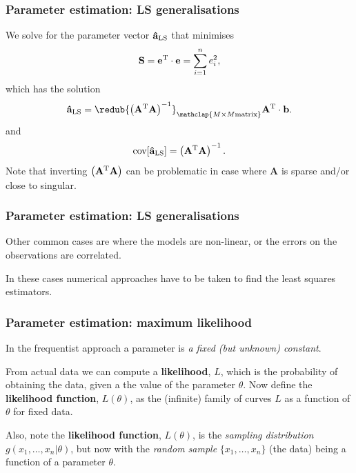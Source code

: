 \begin{frame}

\frametitle{Parameter estimation: LS generalisations}
\label{parameterestimation:lsgeneralisations}

We solve for the parameter vector $\mathbf{\hat{a}_{\rm LS}}$ that minimises
\[
\mathbf{S} = \mathbf{e}^{\rm T} \cdot \mathbf{e} = \sum_{i=1}^n e_i^2,
\]
which has the solution
\[
\mathbf{\hat{a}_{\rm LS}} = \redub{\left(\mathbf{A}^{\rm T}\mathbf{A}\right)^{-1}}_{\mathclap{M\times M\text{matrix}}} \mathbf{A}^{\rm T} \cdot \mathbf{b}.
\]
and
\[
\text{cov}[\mathbf{\hat{a}_{\rm LS}}] = \left(\mathbf{A}^{\rm T}\mathbf{A}\right)^{-1}.
\]
Note that inverting $\left(\mathbf{A}^{\rm T}\mathbf{A}\right)$ can be problematic in case where $\mathbf{A}$
is sparse and\slash or close to singular.

\end{frame}

\begin{frame}

\frametitle{Parameter estimation: LS generalisations}
\label{parameterestimation:lsgeneralisations}

Other common cases are where the models are non-linear, or the errors on the observations are correlated.

In these cases numerical approaches have to be taken to find the least squares estimators.

\end{frame}

\begin{frame}

\frametitle{Parameter estimation: maximum likelihood}
\label{parameterestimation:maximumlikelihood}

In the frequentist approach a parameter is \emph{a fixed (but unknown) constant}.

From actual data we can compute a \textbf{likelihood}, $L$, which is the probability of obtaining the
data, given a the value of the parameter $\theta$. Now define the \textbf{likelihood function},
$L(\theta)$, as the (infinite) family of curves $L$ as a function of $\theta$ for fixed data.

Also, note the \textbf{likelihood function}, $L(\theta)$, is the \emph{sampling distribution}
$g(x_1,\ldots,x_n|\theta)$, but now with the \emph{random sample} $\{x_1,\ldots,x_n\}$ (the data) being a function of
a parameter $\theta$.

\end{frame}

